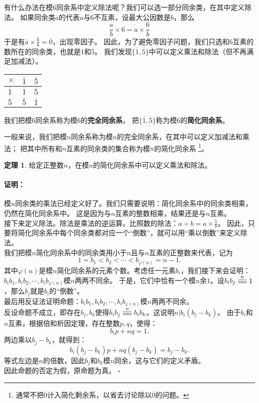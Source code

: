 \documentclass[12pt,UTF8]{ctexbook}
\theoremstyle{definition}
\newtheorem{tm}{定理}[section]
\theoremstyle{plain}
\renewenvironment{proof}{\paragraph{\textbf{证明：}}}{\hfill$\square$}
\newcommand{\tong}[1]{\overset{#1}{\equiv\joinrel\equiv}}
\begin{document}
有什么办法在模$6$同余系中定义除法呢？我们可以选一部分同余类，在其中定义除法。
如果同余类$\overline{a}$的代表$a$与$6$不互素，设最大公因数是$b$，那么
$$ \frac{a}{b} \times 6 = a \times \frac{6}{b} $$
于是有$\overline{a} \times \overline{\frac{6}{b}} = \overline{0}$，出现零因子。
因此，为了避免零因子问题，我们只选和$6$互素的数所在的同余类，也就是$\overline{1}$和$\overline{5}$。
我们发现$\{\overline{1}, \overline{5}\}$中可以定义乘法和除法（但不再满足加减法）。
\begin{center}
    \begin{tabular}{ | p{2em}<{\centering} | p{2em}<{\centering} | p{2em}<{\centering} | }
        \hline
            $\times$   & $\overline{1}$ & $\overline{5}$ \\ [0.5ex] 
        \hline
        $\overline{1}$ & $\overline{1}$ & $\overline{5}$ \\
        \hline
        $\overline{5}$ & $\overline{5}$ & $\overline{1}$ \\
        \hline
    \end{tabular}
\end{center}
我们把模$6$同余系称为模$6$的\textbf{完全同余系}，
把$\{\overline{1}, \overline{5}\}$称为模$6$的\textbf{简化同余系}。

一般来说，我们把模$n$同余系称为模$n$的完全同余系，在其中可以定义加减法和乘法；
把其中所有和$n$互素的同余类的集合称为模$n$的简化同余系
\footnote{通常不把$\overline{0}$计入简化剩余系，以省去讨论除以$\overline{0}$的问题。}。

\begin{tm}\label{tm:3-2-0}
    给定正整数$n$，在模$n$的简化同余系中可以定义乘法和除法。
\end{tm}
\begin{proof}
    模$n$同余类的乘法已经定义好了。我们只需要说明：简化同余系中的同余类相乘，仍然在简化同余系中。
    这是因为与$n$互素的整数相乘，结果还是与$n$互素。\\
    接下来定义除法。除法是乘法的逆运算。比照数的除法：$a \div b = a \times \frac{1}{b}$。
    因此，只要将简化同余系中每个同余类都对应一个“倒数”，就可以用“乘以倒数”来定义除法。\\
    我们把模$n$简化同余系中的同余类用小于$n$且与$n$互素的正整数来代表，记为
    $$1 = b_1 < b_2 < \cdots < b_{\varphi(n)} = n-1.$$
    其中$\varphi(n)$是模$n$简化同余系的元素个数。考虑任一元素$b_i$，我们接下来会证明：
    $b_ib_1, b_ib_2, \cdots, b_ib_{\varphi(n)}$模$n$两两不同余。
    于是，它们中恰有一个模$n$余$1$。设$b_ib_j \tong{n} 1$，那么$b_j$就是$b_i$的“倒数”。\\
    最后用反证法证明命题：$b_ib_1, b_ib_2, \cdots, b_ib_{\varphi(n)}$模$n$两两不同余。\\
    反设命题不成立，即存在$b_j, b_k$使得$b_ib_j \tong{n} b_ib_k$。这说明$n | b_i(b_j - b_k)$。
    由于$b_i$和$n$互素，根据倍和析因定理，存在整数$p, q$，使得：
    $$ b_ip + nq = 1.$$
    两边乘以$b_j - b_k$，就得到：
    $$ b_i(b_j - b_k)p + nq(b_j - b_k) = b_j - b_k.$$
    等式左边是$n$的倍数，因此$b_j$和$b_k$模$n$同余，这与它们的定义矛盾。\\
    因此命题的否定为假，原命题为真。
\end{proof}
\end{document}

